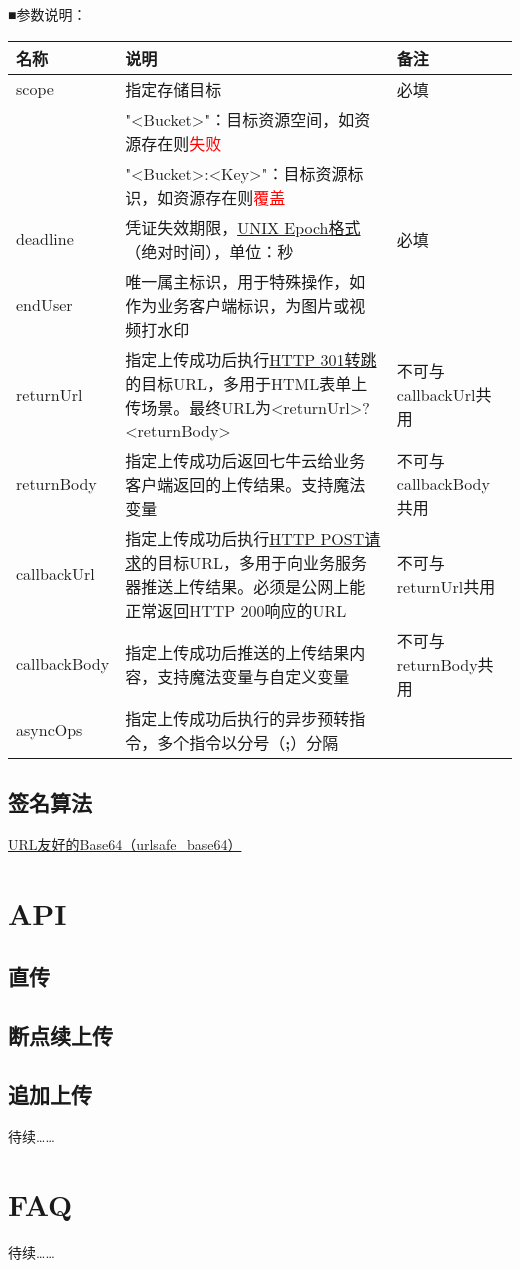\documentclass[11pt, oneside]{book}
\newcommand{\qpara}[1]{
\vspace{0.3em}
\noindent
#1\par
\vspace{0.3em}
}
\newcommand{\qtable}[1]{\footnotesize\vspace{0.5em}#1\vspace{0.5em}\normalsize}
\begin{document}
\qpara{■\thinspace 参数说明：}
\qtable{
\def\arraystretch{2}
\begin{tabular}{|l|p{25em}|p{8em}|}
\hline
名称 & 说明 & 备注 \\
\hline
scope & 指定存储目标 & 必填 \\
\cline{2-2}
      & "<Bucket>"：目标资源空间，如资源存在则\textcolor{red}{失败} & \\
\cline{2-2}
      & "<Bucket>:<Key>"：目标资源标识，如资源存在则\textcolor{red}{覆盖} & \\
\hline
deadline & 凭证失效期限，\href{http://en.wikipedia.org/wiki/Unix_time}{UNIX Epoch格式}（绝对时间），单位：秒 & 必填 \\
\hline
endUser & 唯一属主标识，用于特殊操作，如作为业务客户端标识，为图片或视频打水印 & \\
\hline
returnUrl & 指定上传成功后执行\href{http://en.wikipedia.org/wiki/HTTP_301}{HTTP 301转跳}的目标URL，多用于HTML表单上传场景。最终URL为<returnUrl>?<returnBody> & 不可与callbackUrl共用 \\
\hline
returnBody & 指定上传成功后返回七牛云给业务客户端返回的上传结果。支持魔法变量 & 不可与callbackBody共用 \\
\hline
callbackUrl & 指定上传成功后执行\href{http://en.wikipedia.org/wiki/POST_(HTTP)}{HTTP POST请求}的目标URL，多用于向业务服务器推送上传结果。必须是公网上能正常返回HTTP 200响应的URL & 不可与returnUrl共用 \\
\hline
callbackBody & 指定上传成功后推送的上传结果内容，支持魔法变量与自定义变量 & 不可与returnBody共用 \\
\hline
asyncOps & 指定上传成功后执行的异步预转指令，多个指令以分号（{\bf ;}）分隔 & \\
\hline
\end{tabular}
}

\section{签名算法}

\href{http://zh.wikipedia.org/wiki/Base64#.E5.9C.A8URL.E4.B8.AD.E7.9A.84.E5.BA.94.E7.94.A8}{URL友好的Base64（urlsafe\_base64）}

\chapter{API}

\section{直传}

\section{断点续上传}

\section{追加上传}

\qpara{待续……}

\chapter{FAQ}

\qpara{待续……}
\end{document}
